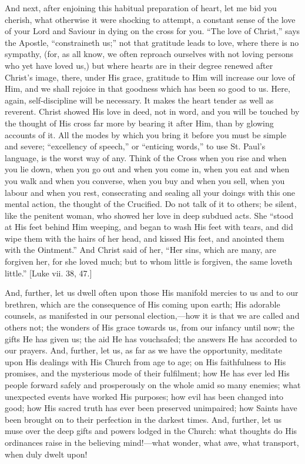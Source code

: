 And next, after enjoining this habitual preparation of heart, let
me bid you cherish, what otherwise it were shocking to attempt, a
constant sense of the love of your Lord and Saviour in dying on the
cross for you. ``The love of Christ,'' says the Apostle,
``constraineth us;'' not that gratitude leads to love, where
there is no sympathy, (for, as all know, we often reproach ourselves
with not loving persons who yet have loved us,) but where hearts are
in their degree renewed after Christ's image, there, under His grace,
gratitude to Him will increase our love of Him, and we shall rejoice
in that goodness which has been so good to us. Here, again,
self-discipline will be necessary. It makes the heart tender as well
as reverent. Christ showed His love in deed, not in word, and you will
be touched by the thought of His cross far more by bearing it after
Him, than by glowing accounts of it. All the modes by which you bring
it before you must be simple and severe; ``excellency of
speech,'' or ``enticing words,'' to use St. Paul's
language, is the worst way of any. Think of the Cross when you rise
and when you lie down, when you go out and when you come in, when you
eat and when you walk and when you converse, when you buy and when you
sell, when you labour and when you rest, consecrating and sealing all
your doings with this one mental action, the thought of the Crucified.
Do not talk of it to others; be silent, like the penitent woman, who
showed her love in deep subdued acts. She ``stood at His feet
behind Him weeping, and began to wash His feet with tears, and did
wipe them with the hairs of her head, and kissed His feet, and
anointed them with the Ointment.'' And Christ said of her,
``Her sins, which are many, are forgiven her, for she loved much;
but to whom little is forgiven, the same loveth little.'' [Luke
vii. 38, 47.]

And, further, let us dwell often upon those His manifold mercies to
us and to our brethren, which are the consequence of His coming upon
earth; His adorable counsels, as manifested in our personal election,—how
it is that we are called and others not; the wonders of His grace
towards us, from our infancy until now; the gifts He has given us; the
aid He has vouchsafed; the answers He has accorded to our prayers.
And, further, let us, as far as we have the opportunity, meditate upon
His dealings with His Church from age to age; on His faithfulness to
His promises, and the mysterious mode of their fulfilment; how He has
ever led His people forward safely and prosperously on the whole amid
so many enemies; what unexpected events have worked His purposes; how
evil has been changed into good; how His sacred truth has ever been
preserved unimpaired; how Saints have been brought on to their
perfection in the darkest times. And, further, let us muse over the
deep gifts and powers lodged in the Church: what thoughts do His
ordinances raise in the believing mind!—what wonder, what awe, what
transport, when duly dwelt upon!

